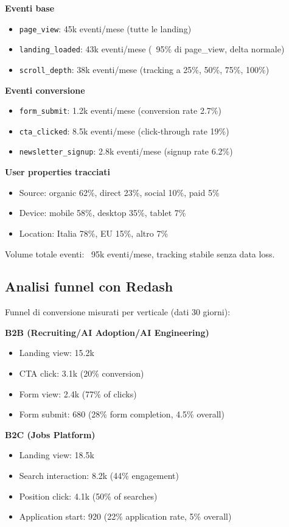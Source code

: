 \textbf{Eventi base}
\begin{itemize}
  \item \texttt{page\_view}: 45k eventi/mese (tutte le landing)
  \item \texttt{landing\_loaded}: 43k eventi/mese (~95\% di page\_view, 
        delta normale)
  \item \texttt{scroll\_depth}: 38k eventi/mese (tracking a 25\%, 50\%, 
        75\%, 100\%)
\end{itemize}

\textbf{Eventi conversione}
\begin{itemize}
  \item \texttt{form\_submit}: 1.2k eventi/mese (conversion rate 2.7\%)
  \item \texttt{cta\_clicked}: 8.5k eventi/mese (click-through rate 19\%)
  \item \texttt{newsletter\_signup}: 2.8k eventi/mese (signup rate 6.2\%)
\end{itemize}

\textbf{User properties tracciati}
\begin{itemize}
  \item Source: organic 62\%, direct 23\%, social 10\%, paid 5\%
  \item Device: mobile 58\%, desktop 35\%, tablet 7\%
  \item Location: Italia 78\%, EU 15\%, altro 7\%
\end{itemize}

Volume totale eventi: ~95k eventi/mese, tracking stabile senza data loss.

\subsection{Analisi funnel con Redash}
Funnel di conversione misurati per verticale (dati 30 giorni):

\textbf{B2B (Recruiting/AI Adoption/AI Engineering)}
\begin{itemize}
  \item Landing view: 15.2k
  \item CTA click: 3.1k (20\% conversion)
  \item Form view: 2.4k (77\% of clicks)
  \item Form submit: 680 (28\% form completion, 4.5\% overall)
\end{itemize}

\textbf{B2C (Jobs Platform)}
\begin{itemize}
  \item Landing view: 18.5k
  \item Search interaction: 8.2k (44\% engagement)
  \item Position click: 4.1k (50\% of searches)
  \item Application start: 920 (22\% application rate, 5\% overall)
\end{itemize}

